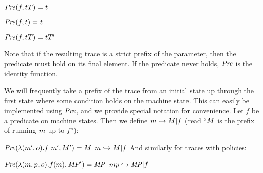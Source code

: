 \documentclass[acmsmall,review,anonymous]{acmart}\settopmatter{printfolios=true,printccs=false,printacmref=false}
\begin{document}
\begin{center}
\begin{minipage}{.3\textwidth}
         {\(\mathit{Pre}(f,tT) = t\)}
\end{minipage}
%
\begin{minipage}{.3\textwidth}
\judgment{}
         {\(\mathit{Pre}(f,t) = t\)}
\end{minipage}
\begin{minipage}{.3\textwidth}
            {\(\mathit{Pre}(f,tT) = tT'\)}
\end{minipage}
\end{center}
%
Note that if the resulting trace is a strict prefix of the parameter, then the
predicate must hold on its final element. If the predicate never holds,
\(\mathit{Pre}\) is the identity function.



We will frequently take a prefix of the trace from an initial state up
through the first state where some condition holds on the machine state.
This can easily be implemented using \(\mathit{Pre}\), and we provide special notation
for convenience.
%
Let \(f\) be a predicate on machine states. Then we define \(m
\hookrightarrow M | f\) (read ``\(M\) is the prefix of
running \(m\) up to \(f\)''):   

            {\(\PUT(\lambda (\mach',\obs).f\ \mach',\machT')
              = \machT\)}
            {\(m \hookrightarrow M | f\)}
\noindent
And similarly for traces with policies:

            {\(\mathit{Pre}(\lambda (m,p,o).f(m),\mathit{MP}') = \mathit{MP}\)}
         {\(mp \hookrightarrow \mathit{MP} | f\)}
\end{document}
